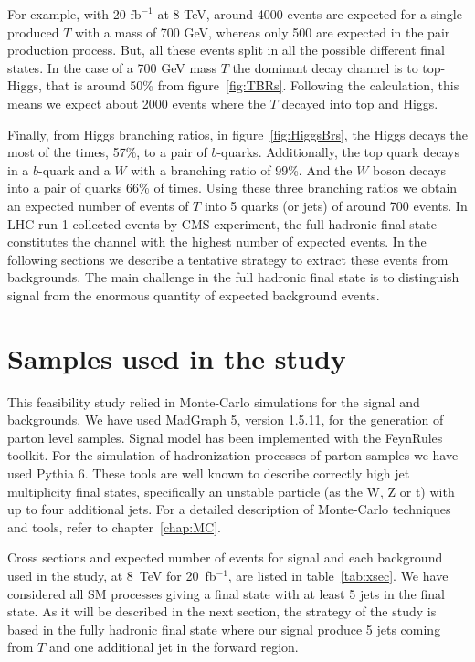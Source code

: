 For example, with 20 $\text{fb}^{-1}$ at 8 TeV, around 4000 events are expected for a single produced $T$ with a mass of 700 GeV, whereas only 500 are expected in the pair production process. But, all these events split in all the possible different final states. In the case of a 700 GeV mass $T$ the dominant decay channel is to top-Higgs, that is around 50\% from figure~\ref{fig:TBRs}. Following the calculation, this means we expect about 2000 events where the $T$ decayed into top and Higgs. 

Finally, from Higgs branching ratios, in figure~\ref{fig:HiggsBrs}, the Higgs decays the most of the times, 57\%, to a pair of $b$-quarks. Additionally, the top quark decays in a $b$-quark and a $W$ with a branching ratio of 99\%. And the $W$ boson decays into a pair of quarks 66\% of times. Using these three branching ratios we obtain an expected number of events of $T$ into 5 quarks (or jets) of around 700 events. In LHC run 1 collected events by CMS experiment, the full hadronic final state constitutes the channel with the highest number of expected events. In the following sections we describe a tentative strategy to extract these events from backgrounds. The main challenge in the full hadronic final state is to distinguish signal from the enormous quantity of expected background events.


\section{Samples used in the study}
\label{sec:PhenoSam}

This feasibility study relied in Monte-Carlo simulations for the signal and backgrounds. We have used MadGraph 5, version 1.5.11, for the generation of parton level samples. Signal model has been implemented with the FeynRules toolkit. For the simulation of hadronization processes of parton samples we have used Pythia 6. These tools are well known to describe correctly high jet multiplicity final states, specifically an unstable particle (as the W, Z or t) with up to four additional jets. For a detailed description of Monte-Carlo techniques and tools, refer to chapter~\ref{chap:MC}. 

Cross sections and expected number of events for signal and each background used in the study, at 8~TeV for 20~fb$^{-1}$, are listed in table~\ref{tab:xsec}. We have considered all SM processes giving a final state with at least 5 jets in the final state. As it will be described in the next section, the strategy of the study is based in the fully hadronic final state where our signal produce 5 jets coming from $T$ and one additional jet in the forward region.

